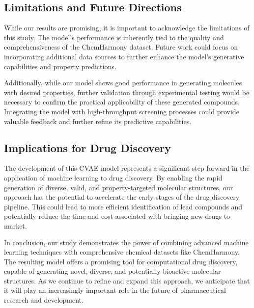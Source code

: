 \subsection{Limitations and Future Directions}

While our results are promising, it is important to acknowledge the limitations of this study. The model's performance is inherently tied to the quality and comprehensiveness of the ChemHarmony dataset. Future work could focus on incorporating additional data sources to further enhance the model's generative capabilities and property predictions.

Additionally, while our model shows good performance in generating molecules with desired properties, further validation through experimental testing would be necessary to confirm the practical applicability of these generated compounds. Integrating the model with high-throughput screening processes could provide valuable feedback and further refine its predictive capabilities.

\subsection{Implications for Drug Discovery}

The development of this CVAE model represents a significant step forward in the application of machine learning to drug discovery. By enabling the rapid generation of diverse, valid, and property-targeted molecular structures, our approach has the potential to accelerate the early stages of the drug discovery pipeline. This could lead to more efficient identification of lead compounds and potentially reduce the time and cost associated with bringing new drugs to market.

In conclusion, our study demonstrates the power of combining advanced machine learning techniques with comprehensive chemical datasets like ChemHarmony. The resulting model offers a promising tool for computational drug discovery, capable of generating novel, diverse, and potentially bioactive molecular structures. As we continue to refine and expand this approach, we anticipate that it will play an increasingly important role in the future of pharmaceutical research and development.
